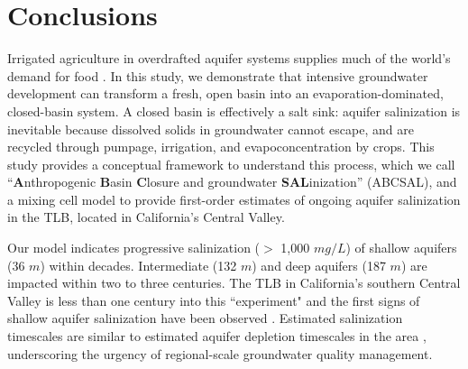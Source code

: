 \section{Conclusions}
\label{s_5}

Irrigated agriculture in overdrafted aquifer systems supplies much of the world's demand for food \citep{dalin2017groundwater}. %
In this study, we demonstrate that intensive groundwater development can transform a fresh, open basin into an evaporation-dominated, closed-basin system. A closed basin is effectively a salt sink: aquifer salinization is inevitable because dissolved solids in groundwater cannot escape, and are recycled through pumpage, irrigation, and evapoconcentration by crops. This study provides a conceptual framework to understand this process, which we call ``\textbf{A}nthropogenic \textbf{B}asin \textbf{C}losure and groundwater \textbf{SAL}inization'' (ABCSAL), and a mixing cell model to provide first-order estimates of ongoing aquifer salinization in the TLB, located in California's Central Valley.  

Our model indicates progressive salinization ($>$ 1,000 $mg/L$) of shallow aquifers (36 $m$) within decades. Intermediate (132 $m$) and deep aquifers (187 $m$) are impacted within two to three centuries. The TLB in California's southern Central Valley is less than one century into this ``experiment" and the first signs of shallow aquifer salinization have been observed \citep{Hansen2018, CRWQCB2018}. Estimated salinization timescales are similar to estimated aquifer depletion timescales in the area \citep{Scanlon2012}, underscoring the urgency of regional-scale groundwater quality management.


